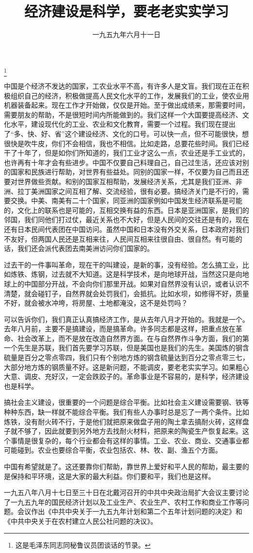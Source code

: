 
\title{经济建设是科学，要老老实实学习}
\date{一九五九年六月十一日}
\thanks{这是毛泽东同志同秘鲁议员团谈话的节录。}
\maketitle


中国是个经济不发达的国家，工农业水平不高，有许多人是文盲。我们现在正在积极组织自己的经济，积极做提高人民文化水平的工作，发展我们的工业，使农业用机器装备起来。现在工作才开始做，仅仅是开始。至于做出成绩来，那需要时间，需要朋友的帮助，不是很短时间内所能做到的。我们这样一个大国要提高经济、文化水平，建设现代化的工业、农业和文化教育，需要一个过程。我们现在提出了“多、快、好、省”这个建设经济、文化的口号。可以快一点，但不可能很快，想很快是吹牛皮，你们不会相信，我也不相信。比如走路，总要花些时间。我们已经干了十年了，但是如你们所知道的，我们工业才这么一点，农业还是手工业式的，也许再有十年才会有些进步。中国不仅要自己料理自己，自己过生活，还应该对别的国家和民族进行帮助，对世界有些益处。同别的国家一样，不仅要为自己而且还要对世界做些贡献。和别的国家互相帮助，发展经济关系，尤其是我们亚洲、非洲、拉丁美洲国家之间互相了解、交流经验，很有必要。搞经济关门是不行的，需要交换。中美、南美有二十个国家，同亚洲的国家例如中国发生经济联系是可能的，文化上的联系也是可能的，互相交换有益的东西。日本是亚洲国家，是我们的邻国，我们同他们打过仗，最近关系也不大好，但是人民间的交往还是有的，现在还有日本民间代表团在中国访问。虽然中国和日本没有外交关系，日本政府对我们不友好，但两国人民还是互相来往，人民间互相来往很自由、很自然。有可能的话，我们还会派代表团去南美洲访问你们国家的。

过去干的一件事叫革命，现在干的叫建设，是新的事，没有经验。怎么搞工业，比如炼铁、炼钢，过去就不大知道。这是科学技术，是向地球开战，当然这只是向地球上的中国部分开战，不会向你们那里开战。如果对自然界没有认识，或者认识不清楚，就会碰钉子，自然界就会处罚我们，会抵抗。比如水坝，如修得不好，质量不好，就会被水冲垮，将房屋、土地都淹没，这不是处罚吗？

可以告诉你们，我们真正认真搞经济工作，是从去年八月才开始的。我就是一个。去年八月前，主要不是搞建设，而是搞革命。许多同志都是这样，把重点放在革命、社会改革上，而不是放在改造自然界方面。在与自然界作斗争方面，我们的第一个先生是苏联，我们首先要学习苏联，但是美国也是我们的先生。美国炼的钢含硫量是百分之零点零四，我们只有个别地方炼的钢含硫量达到百分之零点零三七，大部分地方炼的钢质量不好。这是新问题，不能调皮，要老老实实学习。如果粗心大意、调皮、充好汉，一定会跌跤子的。革命事业是不容易的，是科学，经济建设也是科学。

搞社会主义建设，很重要的一个问题是综合平衡。比如社会主义建设需要钢、铁等种种东西，缺一样就不能综合平衡。我们有些人办事时总是忘了一两个条件。比如炼铁，没有耐火砖不行，于是他们就把原来做盘子用的陶土拿去搞耐火砖，这样盘子就不够了，因此就要到另外地方去找耐火材料，把原来的陶瓷生产恢复起来。这个事情是很复杂的，每个行业都会有这样的事情。工业、农业、商业、交通事业都可能碰到。农业也要综合平衡，农业包括农、林、牧、副、渔五个方面。

中国有希望就是了。这还要靠你们帮助，靠世界上爱好和平人民的帮助，最主要的是保持和平环境，这是大家的最大利益。你们要和平，我们也是这样。

\begin{maonote}
一九五八年八月十七日至三十日在北戴河召开的中共中央政治局扩大会议主要讨论了一九五九年的国民经济计划以及工业生产、农业生产、农村工作和商业工作等问题。会议作出《中共中央关于一九五九年计划和第二个五年计划问题的决定》和《中共中央关于在农村建立人民公社问题的决议》。
\end{maonote}

